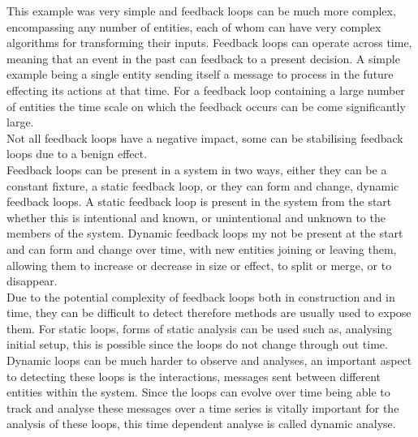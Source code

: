 \documentclass{article}
\begin{document}
This example was very simple and feedback loops can be much more complex, encompassing any number of entities, each of whom can have very complex algorithms for transforming their inputs. Feedback loops can operate across time, meaning that an event in the past can feedback to a present decision. A simple example being a single entity sending itself a message to process in the future effecting its actions at that time. For a feedback loop containing a large number of entities the time scale on which the feedback occurs can be come significantly large.\\
Not all feedback loops have a negative impact, some can be stabilising feedback loops due to a benign effect.\\ 
Feedback loops can be present in a system in two ways, either they can be a constant fixture, a static feedback loop, or they can form and change, dynamic feedback loops. A static feedback loop is present in the system from the start whether this is intentional and known, or unintentional and unknown to the members of the system. Dynamic feedback loops my not be present at the start and can form and change over time, with new entities joining or leaving them, allowing them to increase or decrease in size or effect, to split or merge, or to disappear.\\
Due to the potential complexity of feedback loops both in construction and in time, they can be difficult to detect therefore methods are usually used to expose them. For static loops, forms of static analysis can be used such as, analysing initial setup, this is possible since the loops do not change through out time. Dynamic loops can be much harder to observe and analyses, an important aspect to detecting these loops is the interactions, messages sent between different entities within the system. Since the loops can evolve over time being able to track and analyse these messages over a time series is vitally important for the analysis of these loops, this time dependent analyse is called dynamic analyse.  
\end{document}
